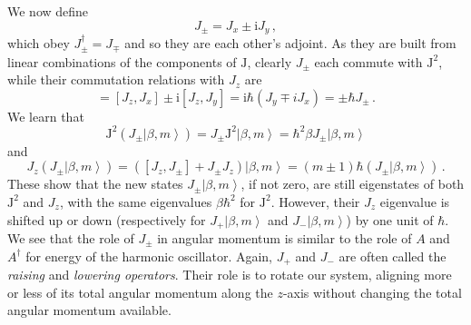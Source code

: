 \documentclass{article}
\theoremstyle{plain}\theoremheaderfont{\normalfont\itshape}\theorembodyfont{\rmfamily}\theoremseparator{.}\newtheorem*{rem}{Remark}\newtheorem*{ex}{Example}\newtheorem*{proof}{Proof}\newtheorem*{altp}{Alternative proof}
\theoremstyle{plain}\theoremheaderfont{\normalfont\bfseries}\theorembodyfont{\rmfamily}\theoremseparator{.}\newtheorem{thm}{Theorem}[section]\newtheorem{lem}[thm]{Lemma}\newtheorem{prop}[thm]{Proposition}\newtheorem*{cor}{Corollary}\newtheorem{defn}[thm]{Definition}\newtheorem{clm}[thm]{Claim}\newtheorem{clminproof}{Claim}
\theoremstyle{break}\theoremheaderfont{\normalfont\itshape}\theorembodyfont{\rmfamily}\theoremseparator{.\medskip}\newtheorem*{proofskip}{Proof}\newtheorem*{exs}{Examples}\newtheorem*{rems}{Remarks}
\theoremstyle{break}\theoremheaderfont{\normalfont\bfseries}\theorembodyfont{\rmfamily}\theoremseparator{.\medskip}\newtheorem{lemskip}[thm]{Lemma}\newtheorem{defnskip}[thm]{Definition}\newtheorem{propskip}[thm]{Proposition}\newtheorem{thmskip}[thm]{Theorem}
\numberwithin{equation}{section}
\newcommand{\ii}{\mathrm{i}}
\newcommand{\ket}[1]{\left| #1 \right\rangle}
\newcommand{\vb}[1]{\bm{\mathrm{#1}}}
\begin{document}
    We now define
    \begin{equation}
        J_{\pm}=J_{x}\pm \ii J_y\,,
    \end{equation}
    which obey \(J_\pm^\dagger=J_\mp\) and so they are each other's adjoint. As they are built from linear combinations of the components of \(\vb{J}\), clearly \(J_\pm\) each commute with \(\vb{J}^2\), while their commutation relations with \(J_z\) are
    \begin{equation}
        [J_z,J_\pm]=[J_z,J_x]\pm \ii[J_z,J_y]=\ii\hbar(J_y\mp iJ_x)=\pm\hbar J_\pm\,.
    \end{equation}
    We learn that
    \begin{equation}
        \vb{J}^2(J_\pm\ket{\beta,m})=J_\pm\vb{J}^2\ket{\beta,m}=\hbar^2\beta J_\pm \ket{\beta,m}
    \end{equation}
    and
    \begin{equation}
        J_z(J_\pm\ket{\beta,m})=([J_z,J_\pm]+J_\pm J_z)\ket{\beta,m}=(m\pm 1)\hbar(J_\pm\ket{\beta,m})\,.
    \end{equation}
    These show that the new states \(J_\pm\ket{\beta,m}\), if not zero, are still eigenstates of both \(\vb{J}^2\) and \(J_z\), with the same eigenvalues \(\beta\hbar^2\) for \(\vb{J}^2\). However, their \(J_z\) eigenvalue is shifted up or down (respectively for \(J_+\ket{\beta,m}\) and \(J_-\ket{\beta,m}\)) by one unit of \(\hbar\). We see that the role of \(J_\pm\) in angular momentum is similar to the role of \(A\) and \(A^\dagger\) for energy of the harmonic oscillator. Again, \(J_+\) and \(J_-\) are often called the \textit{raising} and \textit{lowering operators}. Their role is to rotate our system, aligning more or less of its total angular momentum along the \(z\)-axis without changing the total angular momentum available.
\end{document}
